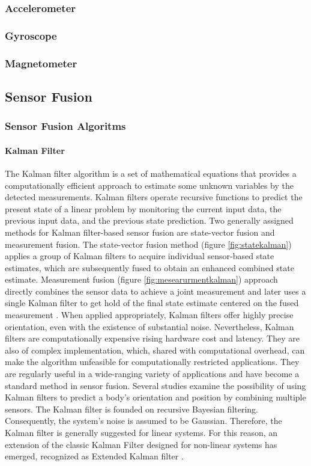 \subsubsection{Accelerometer}
\subsubsection{Gyroscope}
\subsubsection{Magnetometer}
\subsection{Sensor Fusion}
\subsubsection{Sensor Fusion Algoritms}
\paragraph{Kalman Filter}
The Kalman filter algorithm is a set of mathematical equations that provides a computationally efficient approach to estimate some unknown variables by the detected measurements\cite{welch1995introduction}. Kalman filters operate recursive functions to predict the present state of a linear problem by monitoring the current input data, the previous input data, and the previous state prediction.  Two generally assigned methods for Kalman filter-based sensor fusion are state-vector fusion and measurement fusion. The state-vector fusion method (figure \ref{fig:statekalman}) applies a group of Kalman filters to acquire individual sensor-based state estimates, which are subsequently fused to obtain an enhanced combined state estimate. Measurement fusion (figure \ref{fig:mesearurmentkalman}) approach directly combines the sensor data to achieve a joint measurement and later uses a single Kalman filter to get hold of the final state estimate centered on the fused measurement \cite{mosallaei2007process}.
When applied appropriately, Kalman filters offer highly precise orientation, even with the existence of substantial noise. Nevertheless, Kalman filters are computationally expensive rising hardware cost and latency. They are also of complex implementation, which, shared with computational overhead, can make the algorithm unfeasible for computationally restricted applications. They are regularly useful in a wide-ranging variety of applications and have become a standard method in sensor fusion. Several studies examine the possibility of using Kalman filters to predict a body’s orientation and position by combining multiple sensors. The Kalman filter is founded on recursive Bayesian filtering.
Consequently, the system’s noise is assumed to be Gaussian. Therefore, the Kalman filter is generally suggested for linear systems. For this reason, an extension of the classic Kalman Filter designed for non-linear systems has emerged, recognized as Extended Kalman filter \cite{wilson2019formulation}.



